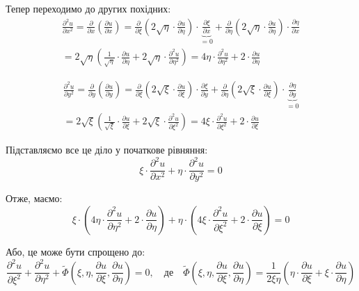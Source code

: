 \documentclass{hw_template}
\begin{document}
Тепер переходимо до других похідних:
\begin{align*}
    \frac{\partial^2 u}{\partial x^2} = \frac{\partial}{\partial x}\left(\frac{\partial u}{\partial x}\right) = \frac{\partial}{\partial \xi}\left(2\sqrt{\eta} \cdot \frac{\partial u}{\partial \eta}\right) \cdot \underbrace{\frac{\partial \xi}{\partial x}}_{=0} + \frac{\partial}{\partial \eta}\left(2\sqrt{\eta} \cdot \frac{\partial u}{\partial \eta}\right) \cdot \frac{\partial \eta}{\partial x} \\
    = 2\sqrt{\eta}\left(\frac{1}{\sqrt{\eta}}\cdot \frac{\partial u}{\partial \eta} + 2\sqrt{\eta} \cdot \frac{\partial^2 u}{\partial \eta^2}\right) = \boxed{4\eta\cdot\frac{\partial^2 u}{\partial \eta^2} + 2 \cdot \frac{\partial u}{\partial \eta}}
\end{align*}

\begin{align*}
    \frac{\partial^2 u}{\partial y^2} = \frac{\partial}{\partial y}\left(\frac{\partial u}{\partial y}\right) = \frac{\partial}{\partial \xi}\left(2\sqrt{\xi} \cdot \frac{\partial u}{\partial \xi}\right) \cdot \frac{\partial \xi}{\partial y} + \frac{\partial}{\partial \eta}\left(2\sqrt{\xi} \cdot \frac{\partial u}{\partial \xi}\right) \cdot \underbrace{\frac{\partial \eta}{\partial y}}_{=0} \\
    = 2\sqrt{\xi}\left(\frac{1}{\sqrt{\xi}} \cdot \frac{\partial u}{\partial \xi} + 2\sqrt{\xi} \cdot \frac{\partial^2 u}{\partial \xi^2}\right) = \boxed{4\xi \cdot \frac{\partial^2 u}{\partial \xi^2} + 2 \cdot \frac{\partial u}{\partial \xi}}
\end{align*}

Підставляємо все це діло у початкове рівняння:
\begin{equation*}
    \xi \cdot \frac{\partial^2 u}{\partial x^2} + \eta \cdot \frac{\partial^2 u}{\partial y^2} = 0
\end{equation*}

Отже, маємо:
\begin{equation*}
    \xi \cdot \left(4\eta \cdot \frac{\partial^2 u}{\partial \eta^2} + 2 \cdot \frac{\partial u}{\partial \eta}\right) + \eta\cdot\left(4\xi \cdot \frac{\partial^2 u}{\partial \xi^2} + 2 \cdot \frac{\partial u}{\partial \xi}\right) = 0
\end{equation*}

Або, це може бути спрощено до:
\begin{equation*}
    \boxed{\frac{\partial^2 u}{\partial \xi^2} + \frac{\partial^2 u}{\partial \eta^2} + \widetilde{\Phi}\left(\xi,\eta,\frac{\partial u}{\partial \xi}, \frac{\partial u}{\partial \eta}\right) = 0, \quad \text{де} \quad \widetilde{\Phi}\left(\xi,\eta,\frac{\partial u}{\partial \xi}, \frac{\partial u}{\partial \eta}\right) = \frac{1}{2\xi\eta}\left(\eta \cdot \frac{\partial u}{\partial \xi} + \xi \cdot \frac{\partial u}{\partial \eta}\right)}
\end{equation*}
\end{document}
